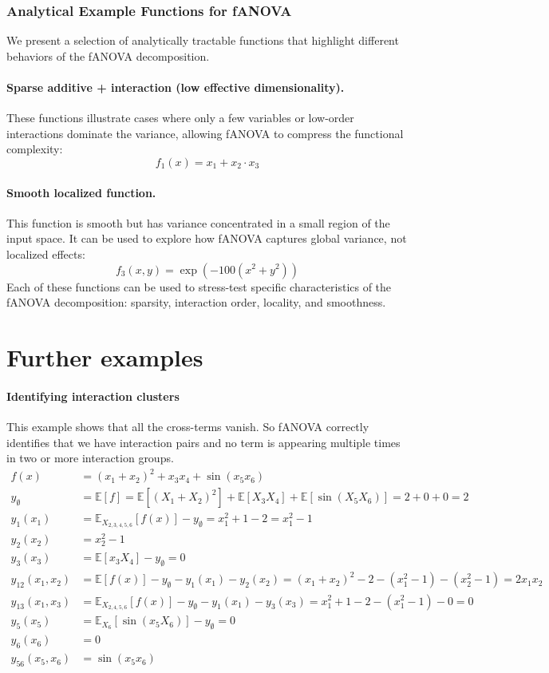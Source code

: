 \subsubsection*{Analytical Example Functions for fANOVA}

We present a selection of analytically tractable functions that highlight different behaviors of the fANOVA decomposition.

\paragraph{Sparse additive + interaction (low effective dimensionality).}
These functions illustrate cases where only a few variables or low-order interactions dominate the variance, allowing fANOVA to compress the functional complexity:
\[
f_1(x) = x_1 + x_2 \cdot x_3
\]


\paragraph{Smooth localized function.}
This function is smooth but has variance concentrated in a small region of the input space. It can be used to explore how fANOVA captures global variance, not localized effects:
\[
f_3(x, y) = \exp\left(-100(x^2 + y^2)\right)
\]
Each of these functions can be used to stress-test specific characteristics of the fANOVA decomposition: sparsity, interaction order, locality, and smoothness.

\section{Further examples}


\paragraph{Identifying interaction clusters}
This example shows that all the cross-terms vanish. So fANOVA correctly identifies that we have interaction pairs and no term is appearing multiple times in two or more interaction groups.
\begin{align*}
f(x) &= (x_1 + x_2)^2 + x_3 x_4 + \sin(x_5 x_6) \\[1em]
y_\emptyset &= \mathbb{E}[f] = \mathbb{E}[(X_1 + X_2)^2] + \mathbb{E}[X_3 X_4] + \mathbb{E}[\sin(X_5 X_6)] = 2 + 0 + 0 = 2 \\[1em]
y_1(x_1) &= \mathbb{E}_{X_{2,3,4,5,6}}[f(x)] - y_\emptyset = x_1^2 + 1 - 2 = x_1^2 - 1 \\
y_2(x_2) &= x_2^2 - 1 \\
y_3(x_3) &= \mathbb{E}[x_3 X_4] - y_\emptyset = 0 \\
y_{12}(x_1, x_2) &= \mathbb{E}[f(x)] - y_\emptyset - y_1(x_1) - y_2(x_2) = (x_1 + x_2)^2 - 2 - (x_1^2 - 1) - (x_2^2 - 1) = 2x_1 x_2 \\
y_{13}(x_1, x_3) &= \mathbb{E}_{X_{2,4,5,6}}[f(x)] - y_\emptyset - y_1(x_1) - y_3(x_3) = x_1^2 + 1 - 2 - (x_1^2 - 1) - 0 = 0 \\
y_5(x_5) &= \mathbb{E}_{X_6}[\sin(x_5 X_6)] - y_\emptyset = 0 \\
y_6(x_6) &= 0 \\
y_{56}(x_5, x_6) &= \sin(x_5 x_6)
\end{align*}


